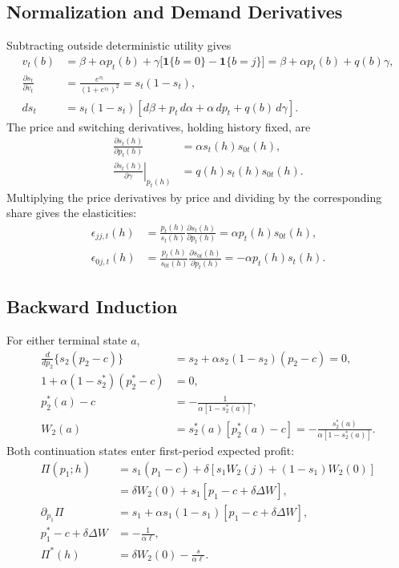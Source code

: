 \documentclass[12pt]{article}
\theoremstyle{definition}
\theoremstyle{remark}
\begin{document}
\subsection{Normalization and Demand Derivatives}
Subtracting outside deterministic utility gives
\begin{align}
 v_t(b)&=\beta+\alpha p_t(b)
 +\gamma\bigl[\mathbf{1}\{b=0\}-\mathbf{1}\{b=j\}\bigr]
 =\beta+\alpha p_t(b)+q(b)\gamma,\\
 \frac{\partial s_t}{\partial v_t}&=\frac{e^{v_t}}{(1+e^{v_t})^2}
 =s_t(1-s_t),\\
 ds_t&=s_t(1-s_t)[d\beta+p_t\,d\alpha+\alpha\,dp_t+q(b)\,d\gamma].
 \label{eq:supply-total-share}
\end{align}
The price and switching derivatives, holding history fixed, are
\begin{align}
 \frac{\partial s_t(h)}{\partial p_t(h)}&=\alpha s_t(h)s_{0t}(h),\\
 \left.\frac{\partial s_t(h)}{\partial\gamma}\right|_{p_t(h)}
 &=q(h)s_t(h)s_{0t}(h).
\end{align}
Multiplying the price derivatives by price and dividing by the corresponding
share gives the elasticities:
\begin{align}
 \epsilon_{jj,t}(h)&=\frac{p_t(h)}{s_t(h)}
 \frac{\partial s_t(h)}{\partial p_t(h)}
 =\alpha p_t(h)s_{0t}(h),\\
 \epsilon_{0j,t}(h)&=\frac{p_t(h)}{s_{0t}(h)}
 \frac{\partial s_{0t}(h)}{\partial p_t(h)}
 =-\alpha p_t(h)s_t(h).
\end{align}

\subsection{Backward Induction}
For either terminal state $a$,
\begin{align}
 \frac{d}{dp_2}\{s_2(p_2-c)\}
 &=s_2+\alpha s_2(1-s_2)(p_2-c)=0,\\
 1+\alpha(1-s_2^*)(p_2^*-c)&=0,\\
 p_2^*(a)-c&=-\frac{1}{\alpha[1-s_2^*(a)]},\\
 W_2(a)&=s_2^*(a)[p_2^*(a)-c]
 =-\frac{s_2^*(a)}{\alpha[1-s_2^*(a)]}.
\end{align}
Both continuation states enter first-period expected profit:
\begin{align}
 \Pi(p_1;h)&=s_1(p_1-c)+\delta[s_1W_2(j)+(1-s_1)W_2(0)]\\
 &=\delta W_2(0)+s_1[p_1-c+\delta\Delta W],\\
 \partial_{p_1}\Pi
 &=s_1+\alpha s_1(1-s_1)[p_1-c+\delta\Delta W],\\
 p_1^*-c+\delta\Delta W&=-\frac{1}{\alpha\ell},\\
 \Pi^*(h)&=\delta W_2(0)-\frac{s}{\alpha\ell}.
\end{align}
\end{document}
